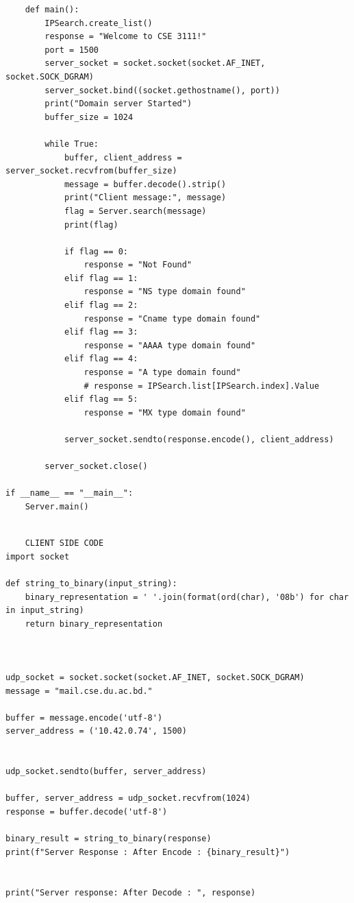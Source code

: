 \documentclass[11pt]{article}
\begin{document}
\begin{itemize}
\begin{verbatim}
    def main():
        IPSearch.create_list()
        response = "Welcome to CSE 3111!"
        port = 1500
        server_socket = socket.socket(socket.AF_INET, socket.SOCK_DGRAM)
        server_socket.bind((socket.gethostname(), port))
        print("Domain server Started")
        buffer_size = 1024

        while True:
            buffer, client_address = server_socket.recvfrom(buffer_size)
            message = buffer.decode().strip()
            print("Client message:", message)
            flag = Server.search(message)
            print(flag)

            if flag == 0:
                response = "Not Found"
            elif flag == 1:
                response = "NS type domain found"
            elif flag == 2:
                response = "Cname type domain found"
            elif flag == 3:
                response = "AAAA type domain found"
            elif flag == 4:
                response = "A type domain found"
                # response = IPSearch.list[IPSearch.index].Value
            elif flag == 5:
                response = "MX type domain found"

            server_socket.sendto(response.encode(), client_address)

        server_socket.close()

if __name__ == "__main__":
    Server.main()


\end{verbatim}


    \begin{verbatim}
    CLIENT SIDE CODE
import socket

def string_to_binary(input_string):
    binary_representation = ' '.join(format(ord(char), '08b') for char in input_string)
    return binary_representation



udp_socket = socket.socket(socket.AF_INET, socket.SOCK_DGRAM)
message = "mail.cse.du.ac.bd."

buffer = message.encode('utf-8')
server_address = ('10.42.0.74', 1500)


udp_socket.sendto(buffer, server_address)

buffer, server_address = udp_socket.recvfrom(1024)
response = buffer.decode('utf-8')

binary_result = string_to_binary(response)
print(f"Server Response : After Encode : {binary_result}")


print("Server response: After Decode : ", response)


\end{verbatim}
\end{itemize}
\end{document}
